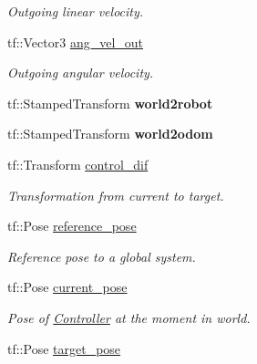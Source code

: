\begin{DoxyCompactItemize}
\begin{DoxyCompactList}\small\item\em Outgoing linear velocity. \end{DoxyCompactList}\item 
tf\+::\+Vector3 \hyperlink{classController_a8c96a76667a4298cd15f6b49a9e23ceb}{ang\+\_\+vel\+\_\+out}\hypertarget{classController_a8c96a76667a4298cd15f6b49a9e23ceb}{}\label{classController_a8c96a76667a4298cd15f6b49a9e23ceb}

\begin{DoxyCompactList}\small\item\em Outgoing angular velocity. \end{DoxyCompactList}\item 
tf\+::\+Stamped\+Transform {\bfseries world2robot}\hypertarget{classController_aaad279e91ae825ab17121759ec46f539}{}\label{classController_aaad279e91ae825ab17121759ec46f539}

\item 
tf\+::\+Stamped\+Transform {\bfseries world2odom}\hypertarget{classController_a0fbeee8dd4ee75f98ca860f1878ba4dd}{}\label{classController_a0fbeee8dd4ee75f98ca860f1878ba4dd}

\item 
tf\+::\+Transform \hyperlink{classController_a171362bdb7fa9335627a5c16e3716525}{control\+\_\+dif}\hypertarget{classController_a171362bdb7fa9335627a5c16e3716525}{}\label{classController_a171362bdb7fa9335627a5c16e3716525}

\begin{DoxyCompactList}\small\item\em Transformation from current to target. \end{DoxyCompactList}\item 
tf\+::\+Pose \hyperlink{classController_a804862aff250a2857c2e145615ae0fdb}{reference\+\_\+pose}\hypertarget{classController_a804862aff250a2857c2e145615ae0fdb}{}\label{classController_a804862aff250a2857c2e145615ae0fdb}

\begin{DoxyCompactList}\small\item\em Reference pose to a global system. \end{DoxyCompactList}\item 
tf\+::\+Pose \hyperlink{classController_a9575ed78c8b37c15f425deb48a3fe413}{current\+\_\+pose}\hypertarget{classController_a9575ed78c8b37c15f425deb48a3fe413}{}\label{classController_a9575ed78c8b37c15f425deb48a3fe413}

\begin{DoxyCompactList}\small\item\em Pose of \hyperlink{classController}{Controller} at the moment in world. \end{DoxyCompactList}\item 
tf\+::\+Pose \hyperlink{classController_aa27e5e790f798a9dd55078b24a326dd6}{target\+\_\+pose}\hypertarget{classController_aa27e5e790f798a9dd55078b24a326dd6}{}\label{classController_aa27e5e790f798a9dd55078b24a326dd6}


\end{DoxyCompactItemize}
